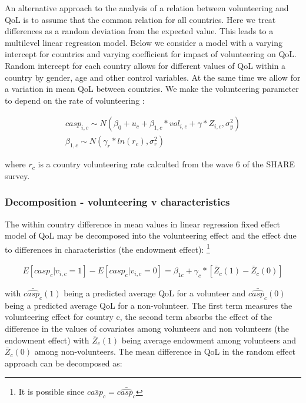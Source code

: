\documentclass[10pt, letterpaper]{article}
\begin{document}
\begin{spacing}{1.4}
An alternative approach to the analysis of a relation between volunteering and QoL is to assume that the common relation for all countries. Here we treat differences as a random deviation from the expected value. This leads to a multilevel linear regression model. Below we consider a model with a varying intercept for countries and varying coefficient for impact of volunteering on QoL. Random intercept for each country allows for different values of QoL within a country by gender, age and other control variables. At the same time we allow for a variation in mean QoL between countries. We make the volunteering parameter to depend on the rate of volunteering :


 \begin{eqnarray}
  \label{eq:casp_mlm}
	casp_{i,c}\sim N(\beta_{0}+ u_{c} +  \beta_{1,c} * vol_{i,c}+\gamma*Z_{i,c},\sigma^{2}_{y}) \\	
	\beta_{1,c} \sim N(\gamma_{r}*ln(r_{c}),\sigma^{2}_{r})
 \end{eqnarray}
 
where $r_{c}$ is a country volunteering rate calculted from the wave 6 of the SHARE survey. 




\subsubsection*{Decomposition - volunteering v characteristics}


The within country difference in mean values in linear regression fixed effect model of QoL  may be decomposed into the volunteering effect and the effect due to differences in characteristics (the endowment effect): \footnote{It is possible since $\bar{casp_{c}} = \bar{\hat{casp_c}}$} 

 \begin{eqnarray}
 \label{eq:casp_ols}
E[casp_{c}|v_{i,c}=1] - E[casp_{c}|v_{i,c}=0]= \beta_{1c}+ \gamma_{c}*[\bar{Z}_{c}(1)-\bar{Z}_{c}(0)]
 \end{eqnarray}

with $\bar{\hat{casp_{c}}}(1)$ being a predicted average QoL for a volunteer and $\bar{\hat{casp_{c}}}(0)$ being a predicted average QoL for a non-volunteer.  The first term measures the volunteering effect for country c, the second term absorbs the effect of the difference in the values of covariates among volunteers and non volunteers (the endowment effect) with $\bar{Z}_{c}(1)$ being average endowment among volunteers and $\bar{Z}_{c}(0)$ among non-volunteers. The mean difference in QoL in the random effect approach can be decomposed as: 


\end{spacing}
\end{document}
